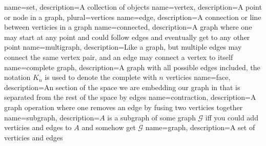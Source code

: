 \usepackage[toc,xindy]{glossaries}

\makenoidxglossaries

{
	name={set},
	description={A collection of objects}
}
{
	name={vertex},
	description={A point or node in a graph},
	plural={vertices}
}
{
	name={edge},
	description={A connection or line between verticies in a graph}
}
{
	name={connected},
	description={A graph where one may start at any point and could follow edges and eventually get to any other point}
}
{
	name={multigraph},
	description={Like a graph, but multiple edges may connect the same vertex pair, and an edge may connect a vertex to itself}
}
{
	name={complete graph},
	description={A graph with all possible edges included, the notation $K_n$ is used to denote the complete with $n$ verticies}
}
{
	name={face},
	description={An section of the space we are embedding our graph in that is separated from the rest of the space by edges}
}
{
	name={contraction},
	description={A graph operation where one removes an edge by fusing two verticies together}
}
{
	name={subgraph},
	description={$A$ is a subgraph of some graph $\mathcal G$ iff you could add verticies and edges to $A$ and somehow get $\mathcal G$}
}
{
	name={graph},
	description={A set of verticies and edges}
}
